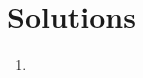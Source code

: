 \documentclass{article}
\begin{document}


\raggedright

\section*{Solutions}
\begin{enumerate}
    \item 
\end{enumerate}
\end{document}
